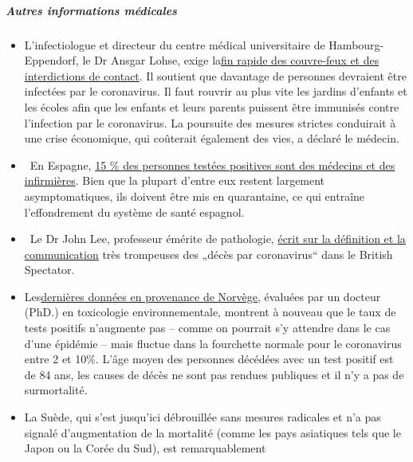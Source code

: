 \hypertarget{autres-informations-muxe9dicales}{%
\subparagraph{\texorpdfstring{\textbf{Autres informations
médicales}}{Autres informations médicales}}\label{autres-informations-muxe9dicales}}

\begin{itemize}
\tightlist
\item
  L'infectiologue et directeur du centre médical universitaire de
  Hambourg-Eppendorf, le Dr Ansgar Lohse, exige
  la\href{https://www.mopo.de/hamburg/uke-infektiologe-fordert-es-muessen-sich-mehr-menschen-mit-corona-infizieren-36483636}{fin
  rapide des couvre-feux et des interdictions de contact}. Il soutient
  que davantage de personnes devraient être infectées par le
  coronavirus. Il faut rouvrir au plus vite les jardins d'enfants et les
  écoles afin que les enfants et leurs parents puissent être immunisés
  contre l'infection par le coronavirus. La poursuite des mesures
  strictes conduirait à une crise économique, qui coûterait également
  des vies, a déclaré le médecin.
\item
  ~En Espagne,
  \href{https://www.heise.de/tp/features/Das-ist-keine-Krise-sondern-eine-Katastrophe-4694104.html}{15
  \% des personnes testées positives sont des médecins et des
  infirmières}. Bien que la plupart d'entre eux restent largement
  asymptomatiques, ils doivent être mis en quarantaine, ce qui entraîne
  l'effondrement du système de santé espagnol.
\item
  ~Le Dr John Lee, professeur émérite de pathologie,
  \href{https://www.spectator.co.uk/article/how-to-understand-and-report-figures-for-covid-19-deaths-}{écrit
  sur la définition et la communication} très trompeuses des „décès par
  coronavirus`` dans le British Spectator.
\item
  Les\href{https://swprs.files.wordpress.com/2020/04/die-lage-in-norwegen.pdf}{dernières
  données en provenance de Norvège}, évaluées par un docteur (PhD.) en
  toxicologie environnementale, montrent à nouveau que le taux de tests
  positifs n'augmente pas -- comme on pourrait s'y attendre dans le cas
  d'une épidémie -- mais fluctue dans la fourchette normale pour le
  coronavirus entre 2 et 10\%. L'âge moyen des personnes décédées avec
  un test positif est de 84 ans, les causes de décès ne sont pas rendues
  publiques et il n'y a pas de surmortalité.
\item
  La Suède, qui s'est jusqu'ici débrouillée sans mesures radicales et
  n'a pas signalé d'augmentation de la mortalité (comme les pays
  asiatiques tels que le Japon ou la Corée du Sud), est remarquablement

\end{itemize}
